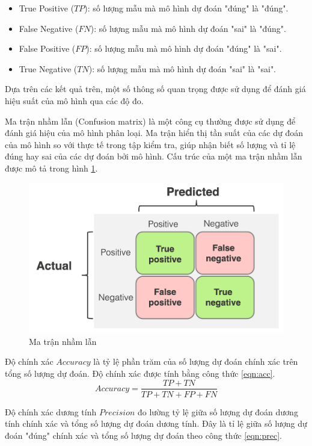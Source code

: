 \begin{itemize}
	\item True Positive ($TP$): số lượng mẫu mà mô hình dự đoán "đúng" là "đúng".
	\item False Negative ($FN$): số lượng mẫu mà mô hình dự đoán "sai" là "đúng".
	\item False Positive ($FP$): số lượng mẫu mà mô hình dự đoán "đúng" là "sai".
	\item True Negative ($TN$): số lượng mẫu mà mô hình dự đoán "sai" là "sai".
\end{itemize}

Dựa trên các kết quả trên, một số thông số quan trọng được sử dụng để đánh giá hiệu suất của mô hình qua các độ đo.

Ma trận nhầm lẫn (Confusion matrix) là một công cụ thường được sử dụng để đánh giá hiệu của mô hình phân loại. Ma trận hiển thị tần suất của các dự đoán của mô hình so với thực tế trong tập kiểm tra, giúp nhận biết số lượng và tỉ lệ đúng hay sai của các dự đoán bởi mô hình. Cấu trúc của một ma trận nhầm lẫn được mô tả trong hình \ref{fig:confusion-matrix}.

\begin{figure}
	\centering
	\includegraphics[width=0.7\linewidth]{images/confusion-matrix}
	\caption{Ma trận nhầm lẫn}
	\label{fig:confusion-matrix}
\end{figure}


Độ chính xác $Accuracy$ là tỷ lệ phần trăm của số lượng dự đoán chính xác trên tổng số lượng dự đoán. Độ chính xác được tính bằng công thức \ref{eqn:acc}.
\begin{equation}
	\label{eqn:acc}
	Accuracy = \frac{TP + TN}{TP + TN + FP + FN}
\end{equation}

Độ chính xác dương tính $Precision$ đo lường tỷ lệ giữa số lượng dự đoán dương tính chính xác và tổng số lượng dự đoán dương tính. Đây là tỉ lệ giữa số lượng dự đoán "đúng" chính xác và tổng số lượng dự đoán theo công thức \ref{eqn:prec}.

